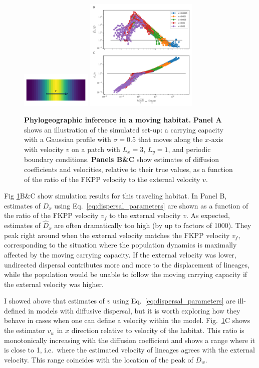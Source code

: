 \documentclass[aps,rmp, twocolumn]{revtex4}
\newcommand{\vfkpp}{v_f}
\begin{document}
\begin{figure}
    \includegraphics[width=0.3\textwidth]{figures/traveling_wave}
    \includegraphics[width=0.48\textwidth]{figures/waves}
    \caption{\label{fig:traveling_wave}{\bf Phylogeographic inference in a moving habitat.}
    {\bf Panel A} shows an illustration of the simulated set-up: a carrying capacity with a Gaussian profile with $\sigma=0.5$ that moves along the $x$-axis with velocity $v$ on a patch with $L_x=3$, $L_y=1$, and periodic boundary conditions.
    {\bf Panels B\&C} show estimates of diffusion coefficients and velocities, relative to their true values, as a function of the ratio of the FKPP velocity to the external velocity $v$. }
\end{figure}


Fig \ref{fig:traveling_wave}B\&C show simulation results for this traveling habitat. In Panel B, estimates of $D_x$ using Eq.~\ref{eq:dispersal_parameters} are shown as a function of the ratio of the FKPP velocity $v_f$ to the external velocity $v$.
As expected, estimates of $\hat{D}_x$ are often dramatically too high (by up to factors of 1000).
They peak right around when the external velocity matches the FKPP velocity $\vfkpp$, corresponding to the situation where the population dynamics is maximally affected by the moving carrying capacity.
If the external velocity was lower, undirected dispersal contributes more and more to the displacement of lineages, while the population would be unable to follow the moving carrying capacity if the external velocity was higher.

I showed above that estimates of $v$ using Eq.~\ref{eq:dispersal_parameters} are ill-defined in models with diffusive dispersal, but it is worth exploring how they behave in cases when one can define a velocity within the model.
Fig.~\ref{fig:traveling_wave}C shows the estimator $v_w$ in $x$ direction relative to velocity of the habitat.
This ratio is monotonically increasing with the diffusion coefficient and shows a range where it is close to 1, i.e.~where the estimated velocity of lineages agrees with the external velocity.
This range coincides with the location of the peak of $D_w$.
\end{document}
